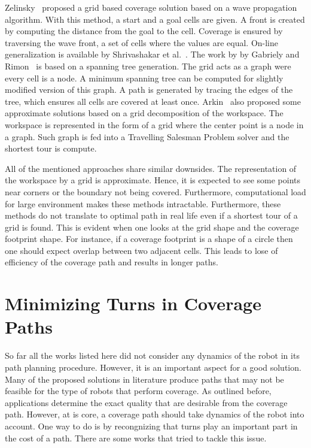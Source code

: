 \documentclass[../main.tex]{subfiles}
\begin{document}
Zelinsky~\cite{Zelinsky1993planning} proposed a grid based coverage solution based on a wave propagation algorithm. With this method, a start and a goal cells are given. A front is created by computing the distance from the goal to the cell. Coverage is ensured by traversing the wave front, a set of cells where the values are equal. On-line generalization is available by Shrivashakar et al.~\cite{shivashankar2011real}. The work by by Gabriely and Rimon~\cite{Gabriely2001spanning} is based on a spanning tree generation. The grid acts as a graph were every cell is a node. A minimum spanning tree can be computed for slightly modified version of this graph. A path is generated by tracing the edges of the tree, which ensures all cells are covered at least once. Arkin~\cite{arkin2000approximation} also proposed some approximate solutions based on a grid decomposition of the workspace. The workspace is represented in the form of a grid where the center point is a node in a graph. Such graph is fed into a Travelling Salesman Problem solver and the shortest tour is compute.

All of the mentioned approaches share similar downsides. The representation of the workspace by a grid is approximate. Hence, it is expected to see some points near corners or the boundary not being covered. Furthermore, computational load for large environment makes these methods intractable. Furthermore, these methods do not translate to optimal path in real life even if a shortest tour of a grid is found. This is evident when one looks at the grid shape and the coverage footprint shape. For instance, if a coverage footprint is a shape of a circle then one should expect overlap between two adjacent cells. This leads to lose of efficiency of the coverage path and results in longer paths.


\section{Minimizing Turns in Coverage Paths}
\label{section:minimizing_turns_in_coverage_paths}

So far all the works listed here did not consider any dynamics of the robot in its path planning procedure. However, it is an important aspect for a good solution. Many of the proposed solutions in literature produce paths that may not be feasible for the type of robots that perform coverage. As outlined before, applications determine the exact quality that are desirable from the coverage path. However, at is core, a coverage path should take dynamics of the robot into account. One way to do is by recongnizing that turns play an important part in the cost of a path. There are some works that tried to tackle this issue.
\end{document}

